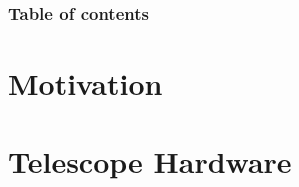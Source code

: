 \documentclass[9pt]{beamer}
\begin{document}


\begin{frame}%
	\frametitle{Table of contents}
	\tableofcontents[hideallsubsections]   %
\end{frame}

\section{Motivation}



\section{Telescope Hardware}


% 

\end{document}

